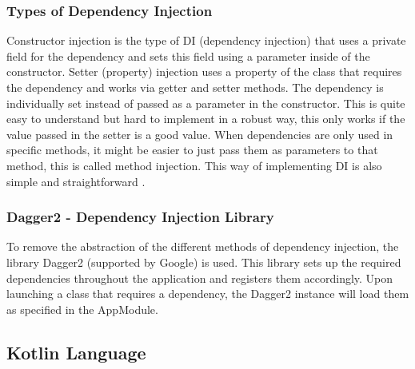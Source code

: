 \subsubsection{Types of Dependency Injection}
Constructor injection is the type of DI (dependency injection) that uses a private field for the dependency and sets this field using a parameter inside of the constructor. Setter (property) injection uses a property of the class that requires the dependency and works via getter and setter methods. The dependency is individually set instead of passed as a parameter in the constructor. This is quite easy to understand but hard to implement in a robust way, this only works if the value passed in the setter is a good value. When dependencies are only used in specific methods, it might be easier to just pass them as parameters to that method, this is called method injection. This way of implementing DI is also simple and straightforward \cite{TheoJungeblut2015}.
\subsubsection{Dagger2 - Dependency Injection Library}
To remove the abstraction of the different methods of dependency injection, the library Dagger2 (supported by Google) is used. This library sets up the required dependencies throughout the application and registers them accordingly. Upon launching a class that requires a dependency, the Dagger2 instance will load them as specified in the AppModule.
\subsection{Kotlin Language}
